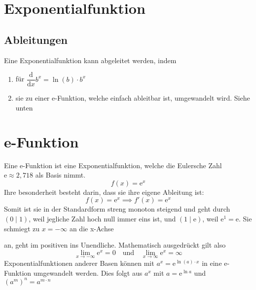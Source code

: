 \documentclass{article}
\begin{document}
  
\section{Exponentialfunktion}
\subsection{Ableitungen}
Eine Exponentialfunktion kann abgeleitet werden, indem
\begin{enumerate}
 \item für $\dfrac{\mathrm{d}}{\mathrm{d}x} b^x = \ln{(b)} \cdot b^x$
 \item sie zu einer e-Funktion, welche einfach ableitbar ist, umgewandelt wird. Siehe unten 
\end{enumerate} 
 
\section{e-Funktion}
 
\begin{minipage}{5cm} 
 \centering
\end{minipage}
\hfill
\begin{minipage}{\dimexpr\textwidth-5cm} 
Eine e-Funktion ist eine Exponentialfunktion, welche die Eulersche Zahl $\mathrm{e} \approx 2,718$ als Basis nimmt.
\[
 f(x)=\mathrm{e}^x
\]
Ihre besonderheit besteht darin, dass sie ihre eigene Ableitung ist:
\[
 f(x)=\mathrm{e}^x \implies f'(x)=\mathrm{e}^x
\] 
Somit ist sie in der Standardform streng monoton steigend und geht durch ${(0 \mid 1)}$, weil jegliche Zahl hoch null immer eins ist, und $(1 \mid \mathrm{e})$, weil $\mathrm{e}^1=\mathrm{e}$. Sie schmiegt zu $x=-\infty$ an die x-Achse \par
\end{minipage}
an, geht im positiven ins Unendliche. Mathematisch ausgedrückt gilt also
\[
 \lim_{x \to -\infty} \mathrm{e}^x = 0
 \quad \text{und} \quad
 \lim_{x \to \infty} \mathrm{e}^x = \infty
\] 
Exponentialfunktionen anderer Basen können mit $a^x = \mathrm{e}^{\ln{(a)} \cdot x}$ in eine e-Funktion umgewandelt werden. Dies folgt aus $a^x$ mit $a=\mathrm{e}^{\ln{a}}$ und $(a^m)^n = a^{m \cdot n}$ 
\end{document}
